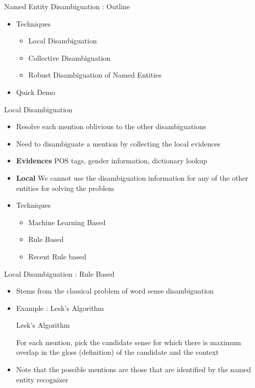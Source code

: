 \documentclass{beamer}
\begin{document}

\begin{frame}{Named Entity Disambiguation : Outline}


 \begin{itemize}
  \item Techniques
  \begin{itemize}
   \item Local Disambiguation \medskip
   \item Collective Disambiguation \medskip
   \item Robust Disambiguation of Named Entities \medskip
  \end{itemize}
  \item Quick Demo
 \end{itemize}

\end{frame}
\begin{frame}{Local Disambiguation}
 \begin{itemize}
  \item Resolve each mention oblivious to the other disambiguations \medskip
  \item Need to disambiguate a mention by collecting the local evidences \medskip
  \item \textbf{Evidences}  POS tags, gender information, dictionary lookup \medskip
  \item \textbf{Local}  We cannot use the disambiguation information for any of the other entities for solving the problem \medskip
  \item Techniques
  \begin{itemize} 
  \item Machine Learning Based
  \item Rule Based
  \item Recent Rule based 
 \end{itemize}
 \end{itemize}
 

\end{frame}
\begin{frame}{Local Disambiguation : Rule Based}
\begin{itemize}
 \item Stems from the classical problem of word sense disambiguation \medskip
 \item Example : Lesk's Algorithm \medskip
  \begin{block}{Lesk's Algorithm} \medskip
       
 For each mention, pick the candidate sense for which there is maximum overlap
 in the gloss (definition) of the candidate and the context
\end{block}
\item Note that the possible mentions are those that are identified by the named entity recognizer
 \end{itemize}

 
\end{frame}
\end{document}
